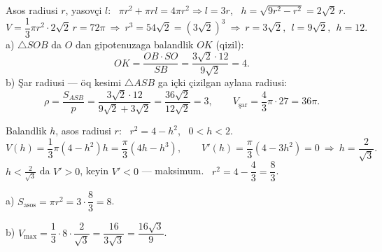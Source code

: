 \newpage
{}
Asos radiusi $r$, yasovçi $l$: \ $\pi r^2+\pi rl=4\pi r^2\Rightarrow l=3r$, \ $h=\sqrt{9r^2-r^2}=2\sqrt2\,r$.
\[V=\frac13\pi r^2\cdot2\sqrt2\,r=72\pi\ \Rightarrow\ r^3=54\sqrt2=\left(3\sqrt2\right)^3\ \Rightarrow\ r=3\sqrt2,\ \ l=9\sqrt2,\ \ h=12.\]
a) $\triangle SOB$ da $O$ dan gipotenuzaga balandlik $OK$ (\textcolor{aux}{qizil}):
\[OK=\frac{OB\cdot SO}{SB}=\frac{3\sqrt2\cdot12}{9\sqrt2}=4.\]
b) Şar radiusi — öq kesimi $\triangle ASB$ ga içki çizilgan aylana radiusi:
\[\rho=\frac{S_{ASB}}{p}=\frac{3\sqrt2\cdot12}{9\sqrt2+3\sqrt2}=\frac{36\sqrt2}{12\sqrt2}=3,\qquad V_{\text{şar}}=\frac43\pi\cdot27=36\pi.\]

\newpage
{}
Balandlik $h$, asos radiusi $r$: \ $r^2=4-h^2$, \ $0<h<2$.
\[V(h)=\frac13\pi\left(4-h^2\right)h=\frac\pi3\left(4h-h^3\right),\qquad V'(h)=\frac\pi3\left(4-3h^2\right)=0\ \Rightarrow\ h=\frac2{\sqrt3}.\]
$h<\frac2{\sqrt3}$ da $V'>0$, keyin $V'<0$ — maksimum. \ $r^2=4-\dfrac43=\dfrac83$.

a) $S_{\text{asos}}=\pi r^2=3\cdot\dfrac83=8$.

b) $V_{\max}=\dfrac13\cdot8\cdot\dfrac2{\sqrt3}=\dfrac{16}{3\sqrt3}=\dfrac{16\sqrt3}9$.

\ShowJavoblar

